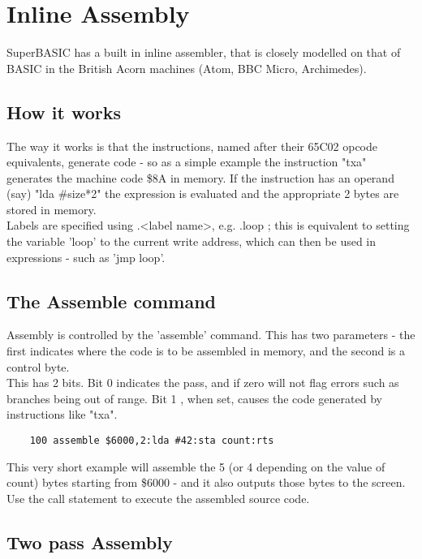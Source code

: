 \chapter{Inline Assembly}

SuperBASIC has a built in inline assembler, that is closely modelled on that of BASIC in the British Acorn machines (Atom, BBC Micro, Archimedes).\\

\section{How it works}

The way it works is that the instructions, named after their 65C02 opcode equivalents, generate code - so as a simple example the instruction "txa" generates the machine code \$8A in memory. If the instruction has an operand (say) "lda \#size*2" the expression is evaluated and the appropriate 2 bytes are stored in memory. \\

Labels are specified using .<label name>, e.g. .loop ; this is equivalent to setting the variable 'loop' to the current write address, which can then be used in expressions - such as 'jmp loop'.

\section {The Assemble command}

Assembly is controlled by the 'assemble' command. This has two parameters - the first indicates where the code is to be assembled in memory, and the second is a control byte. \\

This has 2 bits.  Bit 0 indicates the pass, and if zero will not flag errors such as branches being out of range. Bit 1 , when set, causes the code generated by instructions like "txa".

\begin{verbatim}
	100 assemble $6000,2:lda #42:sta count:rts
\end{verbatim}

This very short example will assemble the 5 (or 4 depending on the value of count) bytes starting from \$6000 - and it also outputs those bytes to the screen. Use the call statement to execute the assembled source code.\\

\section {Two pass Assembly}

